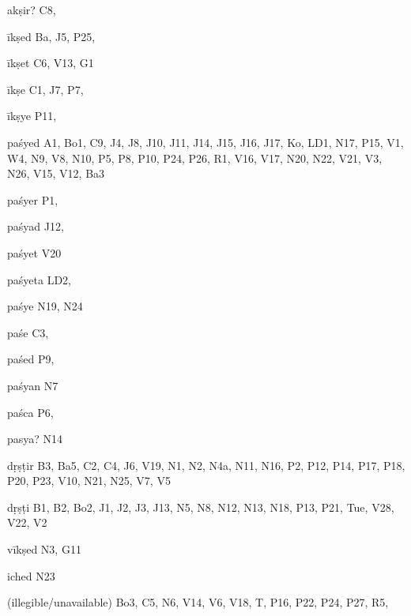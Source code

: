 \begin{ekdosis}
\begin{marma}[hp01_055]
\begin{marma}[hp02_009]
\begin{marma}[hp02_011]
\begin{marma}[hp02_40b]
\begin{description}
    \end{description}
 \end{marma}

 \begin{marma}[hp02_40c]
\item[akṣir?] C8,
\item[īkṣed] Ba, J5, P25,
\item[īkṣet] C6, V13, G1
\item[īkṣe] C1, J7, P7, 
\item[īkṣye] P11, 
\item[paśyed] A1, Bo1, C9, J4, J8, J10, J11, J14, J15, J16, J17, Ko, LD1, N17, P15, V1, W4, N9, V8, N10, P5, P8, P10, P24, P26, R1, V16, V17, N20, N22, V21, V3, N26, V15, V12, Ba3
\item[paśyer] P1,
\item[paśyad] J12,
\item[paśyet] V20
\item[paśyeta] LD2,
\item[paśye] N19, N24
\item[paśe] C3,
\item[paśed] P9, 
\item[paśyan] N7
\item[paśca] P6, 
\item[pasya?] N14  
\item[dṛṣṭir] B3, Ba5, C2, C4, J6, V19, N1, N2, N4a, N11, N16, P2, P12, P14, P17, P18, P20, P23, V10, N21, N25, V7, V5
\item[dṛṣṭi] B1, B2, Bo2, J1, J2, J3, J13, N5, N8, N12, N13, N18, P13, P21, Tue, V28, V22, V2 
\item[vīkṣed] N3, G11
\item[iched] N23
\item[(illegible/unavailable)] Bo3, C5, N6, V14, V6, V18, T, P16, P22, P24, P27, R5,
  \begin{description}

    \end{description}
 \end{marma}


\end{marma}
\end{marma}
\end{marma}
\end{ekdosis}
